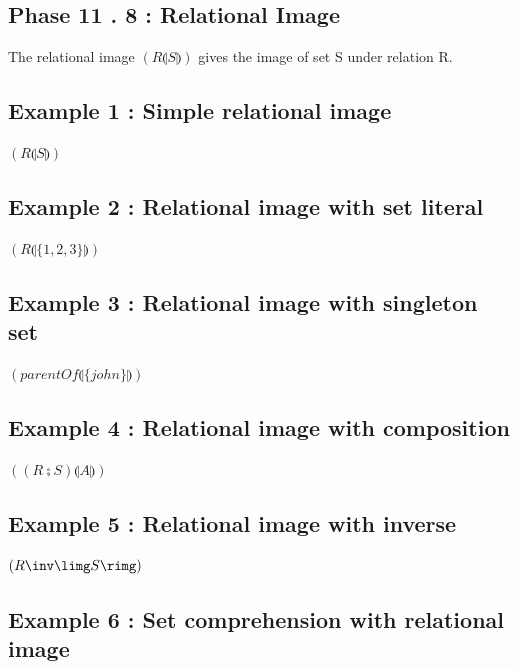 \documentclass[a4paper,10pt,fleqn]{article}
\begin{document}
\subsection*{Phase 11 . 8 : Relational Image}

\noindent The relational image $(R \limg S \rimg)$ gives the image of set S under relation R.

\bigskip

\subsection*{Example 1 : Simple relational image}

\noindent
$(R \limg S \rimg)$


\subsection*{Example 2 : Relational image with set literal}

\noindent
$(R \limg \{1, 2, 3\} \rimg)$


\subsection*{Example 3 : Relational image with singleton set}

\noindent
$(parentOf \limg \{john\} \rimg)$


\subsection*{Example 4 : Relational image with composition}

\noindent
$((R \semi S) \limg A \rimg)$


\subsection*{Example 5 : Relational image with inverse}

\noindent
$(R \inv \limg S \rimg)$


\subsection*{Example 6 : Set comprehension with relational image}
\end{document}

